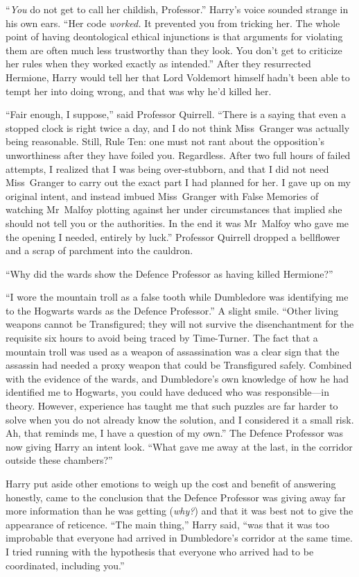 “\emph{You} do not get to call her childish, Professor.” Harry’s voice sounded strange in his own ears. “Her code \emph{worked.} It prevented you from tricking her. The whole point of having deontological ethical injunctions is that arguments for violating them are often much less trustworthy than they look. You don’t get to criticize her rules when they worked exactly as intended.” After they resurrected Hermione, Harry would tell her that Lord Voldemort himself hadn’t been able to tempt her into doing wrong, and that was why he’d killed her.

“Fair enough, I suppose,” said Professor Quirrell. “There is a saying that even a stopped clock is right twice a day, and I do not think Miss~Granger was actually being reasonable. Still, Rule Ten: one must not rant about the opposition’s unworthiness after they have foiled you. Regardless. After two full hours of failed attempts, I realized that I was being over-stubborn, and that I did not need Miss~Granger to carry out the exact part I had planned for her. I gave up on my original intent, and instead imbued Miss~Granger with False Memories of watching Mr~Malfoy plotting against her under circumstances that implied she should not tell you or the authorities. In the end it was Mr~Malfoy who gave me the opening I needed, entirely by luck.” Professor Quirrell dropped a bellflower and a scrap of parchment into the cauldron.

“Why did the wards show the Defence Professor as having killed Hermione?”

“I wore the mountain troll as a false tooth while Dumbledore was identifying me to the Hogwarts wards as the Defence Professor.” A slight smile. “Other living weapons cannot be Transfigured; they will not survive the disenchantment for the requisite six hours to avoid being traced by Time-Turner. The fact that a mountain troll was used as a weapon of assassination was a clear sign that the assassin had needed a proxy weapon that could be Transfigured safely. Combined with the evidence of the wards, and Dumbledore’s own knowledge of how he had identified me to Hogwarts, you could have deduced who was responsible—in theory. However, experience has taught me that such puzzles are far harder to solve when you do not already know the solution, and I considered it a small risk. Ah, that reminds me, I have a question of my own.” The Defence Professor was now giving Harry an intent look. “What gave me away at the last, in the corridor outside these chambers?”

Harry put aside other emotions to weigh up the cost and benefit of answering honestly, came to the conclusion that the Defence Professor was giving away far more information than he was getting (\emph{why?}) and that it was best not to give the appearance of reticence. “The main thing,” Harry said, “was that it was too improbable that everyone had arrived in Dumbledore’s corridor at the same time. I tried running with the hypothesis that everyone who arrived had to be coordinated, including you.”

